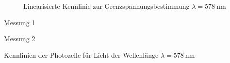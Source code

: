 \begin{figure}
	\centering
	
	\caption{Linearisierte Kennlinie zur Grenzspannungsbestimmung $\lambda = \SI{578}{\nano\metre}$}
	\label{fig:kennlinien_578nm}
\end{figure}

\begin{table}
	\centering
	\begin{subtable}{0.5\textwidth}
		\centering
		\vspace{0pt}
		\resizebox{0.95\columnwidth}{!}{%
			
		}
		\caption{Messung 1}
	\end{subtable}%
	\begin{subtable}{0.5\textwidth}
		\centering
		\vspace{0pt}
		\resizebox{0.95\columnwidth}{!}{%
			
		}
		\caption{Messung 2}
	\end{subtable}

	\caption{Kennlinien der Photozelle f\"ur Licht der Wellenl\"ange $\lambda = \SI{578}{\nano\metre}$}
\end{table}


